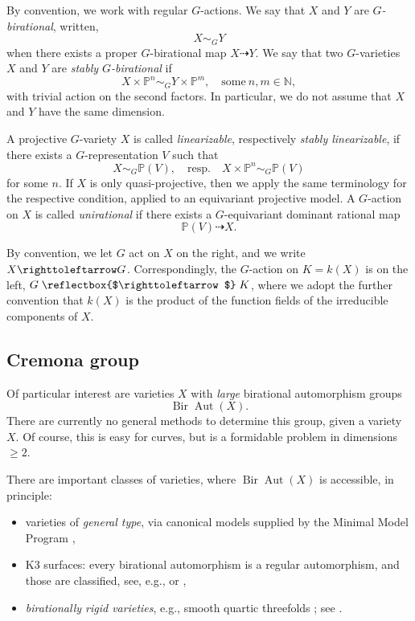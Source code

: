 \documentclass[12pt,reqno]{amsart}
\theoremstyle{plain}
\theoremstyle{remark}
\theoremstyle{definition}
\numberwithin{equation}{section}
\newcommand{\bP}{{\mathbb P}}
\newcommand{\bN}{{\mathbb N}}
\newcommand{\actsfromleft}{\mathrel{\reflectbox{$\righttoleftarrow$}}}
\newcommand{\actsfromright}{\righttoleftarrow}
\DeclareMathOperator{\Aut}{Aut}
\DeclareMathOperator{\Bir}{Bir}
\begin{document}
By convention, we work with regular $G$-actions.
We say that $X$ and $Y$ are \emph{$G$-birational}, written,
$$
X\sim_G Y
$$
when there exists a proper $G$-birational map $X\dashrightarrow Y$.
We say that two $G$-varieties $X$ and $Y$ are {\em stably $G$-birational} if 
$$
X\times \bP^n \sim_G Y\times \bP^m, \quad \text{some}\ n,m \in \bN,
$$
with trivial action on the second factors.
In particular, we do not assume that $X$ and $Y$ have the same dimension. 


A projective $G$-variety $X$ is called {\em linearizable}, respectively {\em stably linearizable}, if there exists a $G$-representation $V$ such that 
$$
X\sim_G \bP(V), \quad \text{resp.} \quad X\times \bP^n \sim_G \bP(V)
$$
for some $n$.
If $X$ is only quasi-projective, then we apply the same terminology for the respective condition, applied to an equivariant projective model.
A $G$-action on $X$ is called {\em unirational} if there exists a $G$-equivariant dominant rational map $$
\bP(V)\dashrightarrow X.
$$


By convention, we let $G$ act on $X$ on the right, and we write $X\actsfromright G$.
Correspondingly, the $G$-action on $K=k(X)$ is on the left, $G\actsfromleft K$, where we adopt the further convention that $k(X)$ is the product of the function fields of the irreducible components of $X$.


\subsection{Cremona group}
\label{sect:cremona}

Of particular interest are varieties $X$ with {\em large} birational automorphism groups
$$
\Bir\Aut(X).
$$
There are currently no general methods to determine this group, given a variety $X$. Of course, this is easy for curves, but is a formidable problem in dimensions $\ge 2$. 




There are important classes of varieties, where $\Bir\Aut(X)$ is accessible, in principle:
\begin{itemize}
\item varieties of {\em general type}, via canonical models
supplied by the Minimal Model Program \cite{HM}, 
\item K3 surfaces: every birational automorphism is a regular automorphism, and those are classified, see, e.g., \cite[Chapter 15]{Huy} or \cite{Brandhorst},
\item {\em birationally rigid varieties}, e.g., smooth quartic threefolds \cite{MI-lu}; see \cite{pukh}.
\end{itemize}
\end{document}
